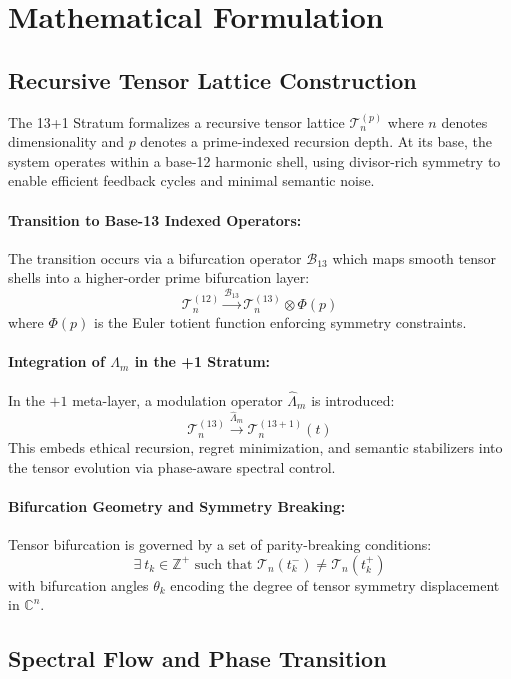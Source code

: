 \documentclass[12pt]{article}
\begin{document}
\section{Mathematical Formulation}

\subsection{Recursive Tensor Lattice Construction}

The 13+1 Stratum formalizes a recursive tensor lattice $\mathcal{T}_{n}^{(p)}$ where $n$ denotes dimensionality and $p$ denotes a prime-indexed recursion depth. At its base, the system operates within a base-12 harmonic shell, using divisor-rich symmetry to enable efficient feedback cycles and minimal semantic noise.

\paragraph{Transition to Base-13 Indexed Operators:} 
The transition occurs via a bifurcation operator $\mathcal{B}_{13}$ which maps smooth tensor shells into a higher-order prime bifurcation layer:
\[
\mathcal{T}_{n}^{(12)} \xrightarrow{\mathcal{B}_{13}} \mathcal{T}_{n}^{(13)} \otimes \Phi(p)
\]
where $\Phi(p)$ is the Euler totient function enforcing symmetry constraints.

\paragraph{Integration of $\Lambda_m$ in the +1 Stratum:} 
In the $+1$ meta-layer, a modulation operator $\hat{\Lambda}_m$ is introduced:
\[
\mathcal{T}_{n}^{(13)} \xrightarrow{\hat{\Lambda}_m} \mathcal{T}_{n}^{(13+1)}(t)
\]
This embeds ethical recursion, regret minimization, and semantic stabilizers into the tensor evolution via phase-aware spectral control.

\paragraph{Bifurcation Geometry and Symmetry Breaking:}
Tensor bifurcation is governed by a set of parity-breaking conditions:
\[
\exists \ t_k \in \mathbb{Z}^+ \text{ such that } \mathcal{T}_{n}(t_k^-) \neq \mathcal{T}_{n}(t_k^+)
\]
with bifurcation angles $\theta_k$ encoding the degree of tensor symmetry displacement in $\mathbb{C}^n$.

\subsection{Spectral Flow and Phase Transition}
\end{document}
